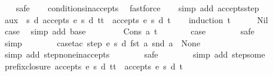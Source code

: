 \begin{isabellebody}
%
\isadelimproof
\ \ %
\endisadelimproof
%
\isatagproof
{}\isamarkupfalse%
\ safe\isanewline
\ \ \isamarkupfalse%
\ conditions{\isacharunderscore}inaccepts\ \isamarkupfalse%
\ fastforce\isanewline
\ \ \isamarkupfalse%
\ {\isacharparenleft}simp\ add{\isacharcolon}\ accepts{\isachardot}step{\isacharparenright}%
\endisatagproof
{\isafoldproof}%
%
\isadelimproof
\isanewline
%
\endisadelimproof
\isanewline
{}\isamarkupfalse%
\ aux{}{\isacharcolon}\ {\isachardoublequoteopen}{\isasymforall}\ s\ d{\isachardot}\ accepts\ e\ s\ d\ {\isacharparenleft}t{\isacharat}t{\isacharprime}{\isacharparenright}\ {\isasymlongrightarrow}\ accepts\ e\ s\ d\ t{\isachardoublequoteclose}\isanewline
%
\isadelimproof
\ \ %
\endisadelimproof
%
\isatagproof
{}\isamarkupfalse%
\ {\isacharparenleft}induction\ t{\isacharparenright}\isanewline
\ \ \ \ \isamarkupfalse%
\ Nil\isanewline
\ \ \ \ \isamarkupfalse%
\ \isamarkupfalse%
\ {\isacharquery}case\ \isamarkupfalse%
\ {\isacharparenleft}simp\ add{\isacharcolon}\ base{\isacharparenright}\isanewline
\ \ \isamarkupfalse%
\isanewline
\ \ \ \ \isamarkupfalse%
\ {\isacharparenleft}Cons\ a\ t{\isacharparenright}\isanewline
\ \ \ \ \isamarkupfalse%
\ \isamarkupfalse%
\ {\isacharquery}case\isanewline
\ \ \ \ \ \ \isamarkupfalse%
\ safe\isanewline
\ \ \ \ \ \ \isamarkupfalse%
\ simp\isanewline
\ \ \ \ \ \ \isamarkupfalse%
\ {\isacharparenleft}case{\isacharunderscore}tac\ {\isachardoublequoteopen}step\ e\ s\ d\ {\isacharparenleft}fst\ a{\isacharparenright}\ {\isacharparenleft}snd\ a{\isacharparenright}\ {\isacharequal}\ None{\isachardoublequoteclose}{\isacharparenright}\isanewline
\ \ \ \ \ \ \ \isamarkupfalse%
\ {\isacharparenleft}simp\ add{\isacharcolon}\ step{\isacharunderscore}none{\isacharunderscore}inaccepts{\isacharparenright}\isanewline
\ \ \ \ \ \ \isamarkupfalse%
\ safe\isanewline
\ \ \ \ \ \ \isamarkupfalse%
\ {\isacharparenleft}simp\ add{\isacharcolon}\ step{\isacharunderscore}some{\isacharparenright}\isanewline
\ \ \isamarkupfalse%
%
\endisatagproof
{\isafoldproof}%
%
\isadelimproof
\isanewline
%
\endisadelimproof
\isanewline
{}\isamarkupfalse%
\ prefix{\isacharunderscore}closure{\isacharcolon}\ {\isachardoublequoteopen}accepts\ e\ s\ d\ {\isacharparenleft}t{\isacharat}t{\isacharprime}{\isacharparenright}\ {\isasymLongrightarrow}\ accepts\ e\ s\ d\ t{\isachardoublequoteclose}\isanewline

\end{isabellebody}
